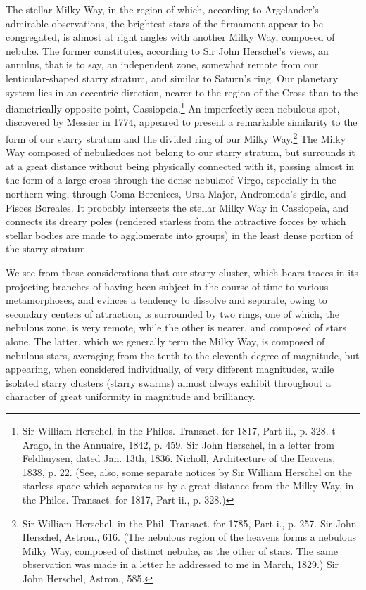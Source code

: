 The stellar Milky Way, in the region of which, according to Argelander's admirable observations, the brightest stars of the firmament appear to be congregated, is almost at right angles with another Milky Way, composed of nebul\ae. The former constitutes, according to Sir John Herschel's views, an annulus, that is to say, an independent zone, somewhat remote from our lenticular-shaped starry stratum, and similar to Saturn's ring. Our planetary system lies in an eccentric direction, nearer to the region of the Cross than to the diametrically opposite point, Cassiopeia.\footnote{Sir William Herschel, in the Philos. Transact. for 1817, Part ii., p. 328. t Arago, in the Annuaire, 1842, p. 459. Sir John Herschel, in a letter from Feldhuysen, dated Jan. 13th, 1836. Nicholl, Architecture of the Heavens, 1838, p. 22. (See, also, some separate notices by Sir William Herschel on the starless space which separates us by a great distance from the Milky Way, in the Philos. Transact. for 1817, Part ii., p. 328.)} An imperfectly seen nebulous spot, discovered by Messier in 1774, appeared to present a remarkable similarity to the form of our starry stratum and the divided ring of our Milky Way.\footnote{Sir William Herschel, in the Phil. Transact. for 1785, Part i., p. 257. Sir John Herschel, Astron., 616. (The nebulous region of the heavens forms a nebulous Milky Way, composed of distinct nebul\ae, as the other of stars. The same observation was made in a letter he addressed to me in March, 1829.) Sir John Herschel, Astron., 585.}
The Milky Way composed of nebul\ae does not belong to our starry stratum, but surrounds it at a great distance without being physically connected with it, passing almost in the form of a large cross through the dense nebul\ae of Virgo, especially in the northern wing, through Coma Berenices, Ursa Major, Andromeda's girdle, and Pisces Boreales. It probably intersects the stellar Milky Way in Cassiopeia, and connects its dreary poles (rendered starless from the attractive forces by which stellar bodies are made to agglomerate into groups) in the least dense portion of the starry stratum.

We see from these considerations that our starry cluster, which bears traces in its projecting branches of having been subject in the course of time to various metamorphoses, and evinces a tendency to dissolve and separate, owing to secondary centers of attraction, is surrounded by two rings, one of which, the nebulous zone, is very remote, while the other is nearer, and composed of stars alone. The latter, which we generally term the Milky Way, is composed of nebulous stars, averaging from the tenth to the eleventh degree of magnitude, but appearing, when considered individually, of very different magnitudes, while isolated starry clusters (starry swarms) almost always exhibit throughout a character of great uniformity in magnitude and brilliancy.

